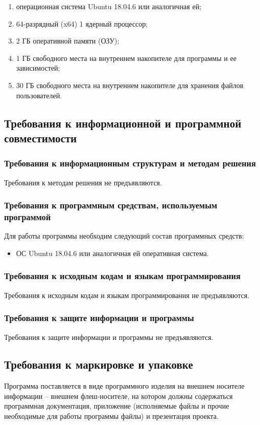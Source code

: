 \documentclass[a4paper,12pt,reqno]{article}
\begin{document}
  \begin{enumerate}
    \item операционная система Ubuntu 18.04.6 или аналогичная ей;
    \item 64-разрядный (x64) 1 ядерный процессор;
    \item 2 ГБ оперативной памяти (ОЗУ);
    \item 1 ГБ свободного места на внутреннем накопителе для программы и ее зависимостей;
    \item 30 ГБ свободного места на внутреннем накопителе для хранения файлов пользователей.
  \end{enumerate}

  \subsection{Требования к информационной и программной совместимости}
  \subsubsection{Требования к информационным структурам и методам решения}
  Требования к методам решения не предъявляются.
  \subsubsection{Требования к программным средствам, используемым программой}
  Для работы программы необходим следующий состав программных средств:
  \begin{itemize}
    \item ОС Ubuntu 18.04.6 или аналогичная ей оперативная система.
  \end{itemize}
  \subsubsection{Требования к исходным кодам и языкам программирования}
  Требования к исходным кодам и языкам программирования не предъявляются.
  \subsubsection{Требования к защите информации и программы}
  Требования к защите информации и программы не предъявляются.

  \subsection{Требования к маркировке и упаковке}
  Программа поставляется в виде программного изделия на внешнем носителе информации -- внешнем флеш-носителе, на котором должны содержаться программная документация, приложение (исполняемые файлы и прочие необходимые для работы программы файлы) и презентация проекта.
\end{document}
